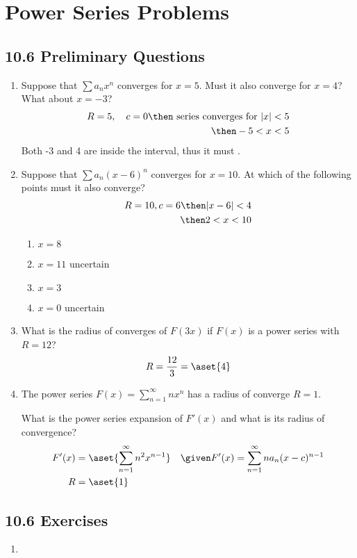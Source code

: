 \section{Power Series Problems}

\subsection{10.6 Preliminary Questions}
\begin{enumerate}
  \item Suppose that \(\sum a_nx^n\) converges for \(x=5\). Must it also
    converge for \(x=4\)? What about \(x=-3\)?
    \begin{align*}
      R = 5, \quad c = 0 \then ~\text{series converges for}~|x| < 5 \\
      \then -5 < x < 5
    \end{align*}
    Both -3 and 4 are inside the interval, thus it must .

  \item Suppose that \(\sum a_n(x-6)^n\) converges for \(x=10\). At which of
    the following points must it also converge?
    \begin{align*}
      R = 10, c = 6 \then |x-6| < 4 \\
      \then 2 < x < 10
    \end{align*}
    \begin{multicols}{2}
    \begin{enumerate}
      \item \(x=8\) 

      \item \(x=11\) uncertain

      \item \(x=3\) 

      \item \(x=0\) uncertain
    \end{enumerate}
    \end{multicols}

  \item What is the radius of converges of \(F(3x)\) if \(F(x)\) is a power
    series with \(R=12\)?
    \[%
    R = \frac{12}{3} = \aset{4}
    \]%

  \item The power series \(\displaystyle F(x) = \sum_{n=1}^{\infty} nx^n\) has
    a radius of converge \(R = 1\).

    What is the power series expansion of \(F'(x)\) and what is its radius of
    convergence?
    \begin{align*}
      F'(x) &= \aset{\sum_{n=1}^{\infty} n^2x^{n-1}}  && \given F'(x) = \sum_{n=1}^{\infty} na_n(x-c)^{n-1}\\
      R &= \aset{1}
    \end{align*}

\end{enumerate}

\subsection{10.6 Exercises}
\begin{enumerate}
  \item

\end{enumerate}
